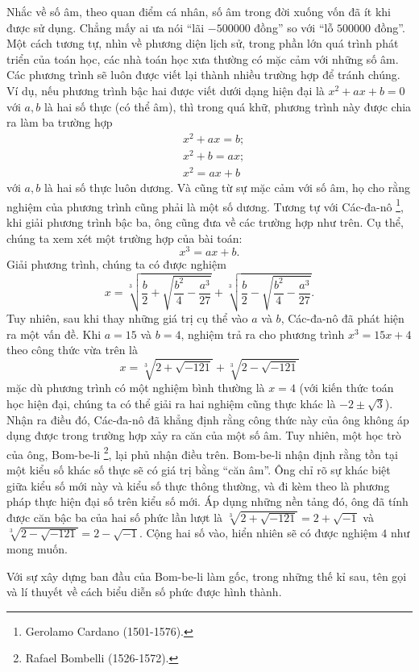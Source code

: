 \documentclass[a4paper, titlepage, openany]{book}
\newcommand\dblquote[1]{\textquotedblleft #1\textquotedblright}
\begin{document}
Nhắc về số âm, theo quan điểm cá nhân, số âm trong đời xuống vốn đã ít khi được sử dụng. Chẳng mấy ai ưa nói \dblquote{lãi $-500000$ đồng} so với \dblquote{lỗ $500000$ đồng}. Một cách tương tự, nhìn về phương diện lịch sử, trong phần lớn quá trình phát triển của toán học, các nhà toán học xưa thường có mặc cảm với những số âm. Các phương trình sẽ luôn được viết lại thành nhiều trường hợp để tránh chúng. Ví dụ, nếu phương trình bậc hai được viết dưới dạng hiện đại là $x^2 + ax+b=0$ với $a,b$ là hai số thực (có thể âm), thì trong quá khữ, phương trình này được chia ra làm ba trường hợp
\begin{align*}
   &x^2+ax = b;\\
   &x^2+b =ax;\\
   &x^2 =ax+b
\end{align*}
với $a,b$ là hai số thực luôn dương. Và cũng từ sự mặc cảm với số âm, họ cho rằng nghiệm của phương trình cũng phải là một số dương. Tương tự với Các-đa-nô \footnote{Gerolamo Cardano (1501-1576).}, khi giải phương trình bậc ba, ông cũng đưa về các trường hợp như trên. Cụ thể, chúng ta xem xét một trường hợp của bài toán: $$x^3 = ax+b.$$ Giải phương trình, chúng ta có được nghiệm $$x=\sqrt[3]{\frac{b}{2} + \sqrt{\frac{b^2}{4}-\frac{a^3}{27}}}+\sqrt[3]{\frac{b}{2} - \sqrt{\frac{b^2}{4}-\frac{a^3}{27}}}.$$ Tuy nhiên, sau khi thay những giá trị cụ thể vào $a$ và $b$, Các-đa-nô đã phát hiện ra một vấn đề. Khi $a=15$ và $b=4$, nghiệm trả ra cho phương trình $x^3 = 15x+4$ theo công thức vừa trên là $$x=\sqrt[3]{2+\sqrt{-121}}+\sqrt[3]{2-\sqrt{-121}}$$ mặc dù phương trình có một nghiệm bình thường là $x=4$ (với kiến thức toán học hiện đại, chúng ta có thể giải ra hai nghiệm cũng thực khác là $-2 \pm \sqrt{3}$). Nhận ra điều đó, Các-đa-nô đã khẳng định rằng công thức này của ông không áp dụng được trong trường hợp xảy ra căn của một số âm. Tuy nhiên, một học trò của ông, Bom-be-li \footnote{Rafael Bombelli (1526-1572).}, lại phủ nhận điều trên. Bom-be-li nhận định rằng tồn tại một kiểu số khác số thực sẽ có giá trị bằng \dblquote{căn âm}. Ông chỉ rõ sự khác biệt giữa kiểu số mới này và kiểu số thực thông thường, và đi kèm theo là phương pháp thực hiện đại số trên kiểu số mới. Áp dụng những nền tảng đó, ông đã tính được căn bậc ba của hai số phức lần lượt là $\sqrt[3]{2+\sqrt{-121}}=2+\sqrt{-1}$ và $\sqrt[3]{2-\sqrt{-121}}=2-\sqrt{-1}$. Cộng hai số vào, hiển nhiên sẽ có được nghiệm $4$ như mong muốn.

Với sự xây dựng ban đầu của Bom-be-li làm gốc, trong những thế kỉ sau, tên gọi và lí thuyết về cách biểu diễn số phức được hình thành.
\end{document}
